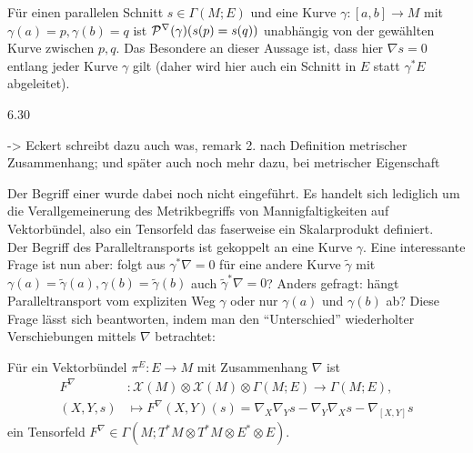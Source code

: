 \documentclass[../H_Analysis_main.tex]{subfiles}
\begin{document}
\begin{bsp}
Für einen parallelen Schnitt $s \in \Gamma(M; E)$ und eine Kurve $\gamma: [a, b] \rightarrow M$ mit $\gamma(a) = p, \gamma(b) = q$ ist $\mathcal{P}^\nabla(\gamma)\qty(s(p) = s(q))$ unabhängig von der gewählten Kurve zwischen $p, q$. Das Besondere an dieser Aussage ist, dass hier $\nabla s = 0$ entlang jeder Kurve $\gamma$ gilt (daher wird hier auch ein Schnitt in $E$ statt $\gamma^* E$ abgeleitet).
\end{bsp}



\begin{lemma}
6.30
\end{lemma}

-> Eckert schreibt dazu auch was, remark 2. nach Definition metrischer Zusammenhang; und später auch noch mehr dazu, bei metrischer Eigenschaft


Der Begriff einer  wurde dabei noch nicht eingeführt. Es handelt sich lediglich um die Verallgemeinerung des Metrikbegriffs von Mannigfaltigkeiten auf Vektorbündel, also ein Tensorfeld das faserweise ein Skalarprodukt definiert.\\



Der Begriff des Paralleltransports ist gekoppelt an eine Kurve $\gamma$. Eine interessante Frage ist nun aber: folgt aus $\gamma^* \nabla = 0$ für eine andere Kurve $\tilde{\gamma}$ mit $\gamma(a) = \tilde{\gamma}(a), \gamma(b) = \tilde{\gamma}(b)$ auch $\tilde{\gamma}^* \nabla = 0$? Anders gefragt: hängt Paralleltransport vom expliziten Weg $\gamma$ oder nur $\gamma(a)$ und $\gamma(b)$ ab? Diese Frage lässt sich beantworten, indem man den \enquote{Unterschied} wiederholter Verschiebungen mittels $\nabla$ betrachtet:

\begin{satz}
Für ein Vektorbündel $\pi^E: E \rightarrow M$ mit Zusammenhang $\nabla$ ist
\begin{equation}
\begin{split}
F^\nabla&: \mathcal{X}(M) \otimes \mathcal{X}(M) \otimes \Gamma(M; E) \rightarrow \Gamma(M; E),
\\
(X, Y, s) &\mapsto F^\nabla(X, Y)(s) = \nabla_X \nabla_Y s - \nabla_Y \nabla_X s - \nabla_{[X, Y]} s
\end{split}
\end{equation}
ein Tensorfeld $F^\nabla \in \Gamma(M; T^* M \otimes T^* M \otimes E^* \otimes E)$.
\end{satz}
\end{document}
